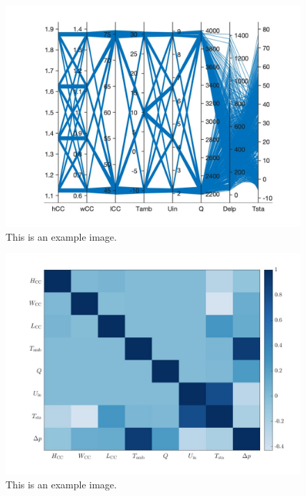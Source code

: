         \begin{figure}[H]
            \centering
            \includegraphics[width=1\textwidth]{00_Images/00_Large_Stack_Images/00_Parallel_Coordinate_Plot_July_10_2024_v1.jpg}  %
            \caption{This is an example image.}
            \label{fig:example1}
        \end{figure}

        \begin{figure}[H]
            \centering
            \includegraphics[width=1\textwidth]{00_Images/00_Large_Stack_Images/00_Spearman_Correlation_Matrix_Heatmap_July_10_2024_v1.jpg}  %
            \caption{This is an example image.}
            \label{fig:example1}
        \end{figure}

            